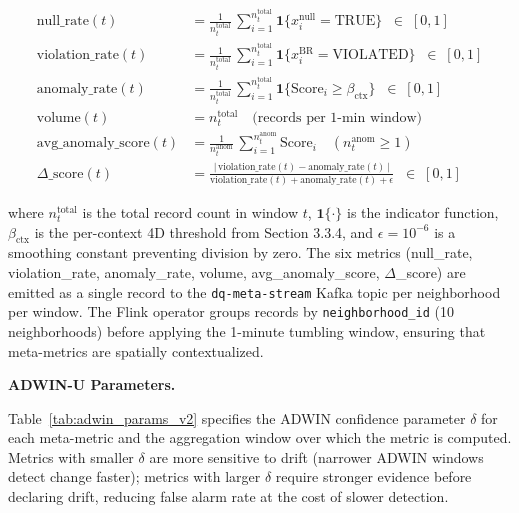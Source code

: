 \begin{align}
\text{null\_rate}(t) &= \frac{1}{n_t^{\text{total}}}\,
                           \sum_{i=1}^{n_t^{\text{total}}} \mathbf{1}\{x_i^{\text{null}} = \text{TRUE}\}
                           \;\;\in\;[0, 1] \label{eq:null_rate_v2} \\[6pt]
\text{violation\_rate}(t) &= \frac{1}{n_t^{\text{total}}}\,
                              \sum_{i=1}^{n_t^{\text{total}}} \mathbf{1}\{x_i^{\text{BR}} = \text{VIOLATED}\}
                              \;\;\in\;[0, 1] \label{eq:violation_rate_v2} \\[6pt]
\text{anomaly\_rate}(t) &= \frac{1}{n_t^{\text{total}}}\,
                            \sum_{i=1}^{n_t^{\text{total}}} \mathbf{1}\{\text{Score}_i \geq \beta_{\text{ctx}}\}
                            \;\;\in\;[0, 1] \label{eq:anomaly_rate_v2} \\[6pt]
\text{volume}(t) &= n_t^{\text{total}} \quad \text{(records per 1-min window)} \label{eq:volume_v2} \\[6pt]
\text{avg\_anomaly\_score}(t) &= \frac{1}{n_t^{\text{anom}}}\,
                                   \sum_{i=1}^{n_t^{\text{anom}}} \text{Score}_i
                                   \quad (n_t^{\text{anom}} \geq 1) \label{eq:avg_anomaly_score_v2} \\[6pt]
\Delta\_\text{score}(t) &= \frac{\big|\,\text{violation\_rate}(t) - \text{anomaly\_rate}(t)\,\big|}
                               {\text{violation\_rate}(t) + \text{anomaly\_rate}(t) + \epsilon}
                          \;\;\in\;[0, 1] \label{eq:delta_score_v2}
\end{align}

where $n_t^{\text{total}}$ is the total record count in window $t$, $\mathbf{1}\{\cdot\}$ is the indicator function, $\beta_{\text{ctx}}$ is the per-context 4D threshold from Section 3.3.4, and $\epsilon = 10^{-6}$ is a smoothing constant preventing division by zero. The six metrics (null\_rate, violation\_rate, anomaly\_rate, volume, avg\_anomaly\_score, $\Delta$\_score) are emitted as a single record to the \texttt{dq-meta-stream} Kafka topic per neighborhood per window. The Flink operator groups records by \texttt{neighborhood\_id} (10 neighborhoods) before applying the 1-minute tumbling window, ensuring that meta-metrics are spatially contextualized.

\bigskip
\noindent\textbf{ADWIN-U Parameters.}

Table~\ref{tab:adwin_params_v2} specifies the ADWIN confidence parameter $\delta$ for each meta-metric and the aggregation window over which the metric is computed. Metrics with smaller $\delta$ are more sensitive to drift (narrower ADWIN windows detect change faster); metrics with larger $\delta$ require stronger evidence before declaring drift, reducing false alarm rate at the cost of slower detection.

